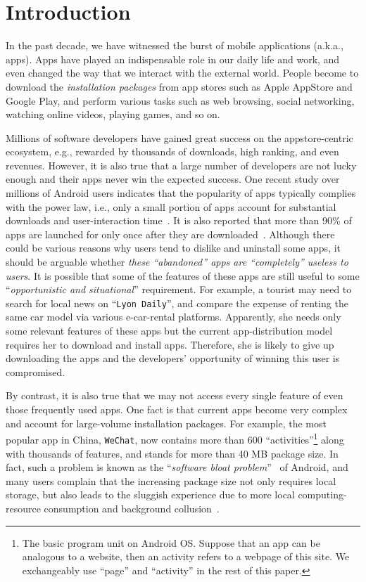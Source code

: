 \section{Introduction}
\label{sec:introduction}


In the past decade, we have witnessed the burst of mobile applications (a.k.a., apps). Apps have played an indispensable role in our daily life and work, and even changed the way that we interact with the external world. People become to download the \textit{installation packages} from app stores such as Apple AppStore and Google Play, and perform various tasks such as web browsing, social networking, watching online videos, playing games, and so on.

Millions of software developers have gained great success on the appstore-centric ecosystem, e.g., rewarded by thousands of downloads, high ranking, and even revenues. However, it is also true that a large number of developers are not lucky enough and their apps never win the expected success. One recent study over millions of Android users indicates that the popularity of apps typically complies with the power law, i.e., only a small portion of apps account for substantial downloads and user-interaction time~\cite{Liu:TSE17}\cite{WWW15Li}. It is also reported that more than 90\% of apps are launched for only once after they are downloaded~\cite{WWW15Li}. Although there could be various reasons why users tend to dislike and uninstall some apps, it should be arguable whether \textit{these ``abandoned'' apps are ``completely'' useless to users}. It is possible that some of the features of these apps are still useful to some ``\textit{opportunistic and situational}'' requirement. For example, a tourist may need to search for local news on ``\texttt{Lyon Daily}'', and compare the expense of renting the same car model via various e-car-rental platforms. Apparently, she needs only some relevant features of these apps but the current app-distribution model requires her to download and install apps. Therefore, she is likely to give up downloading the apps and the developers' opportunity of winning this user is compromised.

By contrast, it is also true that we may not access every single feature of even those frequently used apps. One fact is that current apps become very complex and account for large-volume installation packages. For example, the most popular app in China, \texttt{WeChat}, now contains more than 600 ``activities''\footnote{The basic program unit on  Android OS. Suppose that an app can be analogous to a website, then an activity refers to a webpage of this site. We exchangeably use ``page'' and ``activity'' in the rest of this paper.} along with thousands of features, and stands for more than 40 MB package size. In fact, such a problem is known as the ``\textit{software bloat problem}''~\cite{software_bloat} of Android, and many users complain that the increasing package size not only requires local storage, but also leads to the sluggish experience due to more local computing-resource consumption and background collusion~\cite{WWW17Xu}.

